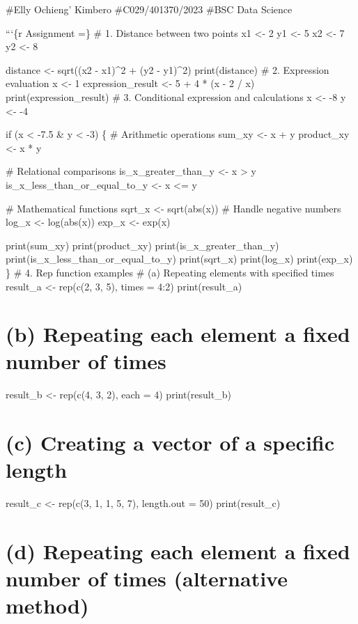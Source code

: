 \documentclass[
]{article}
\author{}
\date{\vspace{-2.5em}}
\begin{document}
\#Elly Ochieng' Kimbero \#C029/401370/2023 \#BSC Data Science

```\{r Assignment =\} \# 1. Distance between two points x1 \textless- 2
y1 \textless- 5 x2 \textless- 7 y2 \textless- 8

distance \textless- sqrt((x2 - x1)\^{}2 + (y2 - y1)\^{}2)
print(distance) \# 2. Expression evaluation x \textless- 1
expression\_result \textless- 5 + 4 * (x - 2 / x)
print(expression\_result) \# 3. Conditional expression and calculations
x \textless- -8 y \textless- -4

if (x \textless{} -7.5 \& y \textless{} -3) \{ \# Arithmetic operations
sum\_xy \textless- x + y product\_xy \textless- x * y

\# Relational comparisons is\_x\_greater\_than\_y \textless- x
\textgreater{} y is\_x\_less\_than\_or\_equal\_to\_y \textless- x
\textless= y

\# Mathematical functions sqrt\_x \textless- sqrt(abs(x)) \# Handle
negative numbers log\_x \textless- log(abs(x)) exp\_x \textless- exp(x)

print(sum\_xy) print(product\_xy) print(is\_x\_greater\_than\_y)
print(is\_x\_less\_than\_or\_equal\_to\_y) print(sqrt\_x) print(log\_x)
print(exp\_x) \} \# 4. Rep function examples \# (a) Repeating elements
with specified times result\_a \textless- rep(c(2, 3, 5), times = 4:2)
print(result\_a)

\section{(b) Repeating each element a fixed number of
times}\label{b-repeating-each-element-a-fixed-number-of-times}

result\_b \textless- rep(c(4, 3, 2), each = 4) print(result\_b)

\section{(c) Creating a vector of a specific
length}\label{c-creating-a-vector-of-a-specific-length}

result\_c \textless- rep(c(3, 1, 1, 5, 7), length.out = 50)
print(result\_c)

\section{(d) Repeating each element a fixed number of times (alternative
method)}\label{d-repeating-each-element-a-fixed-number-of-times-alternative-method}
\end{document}
